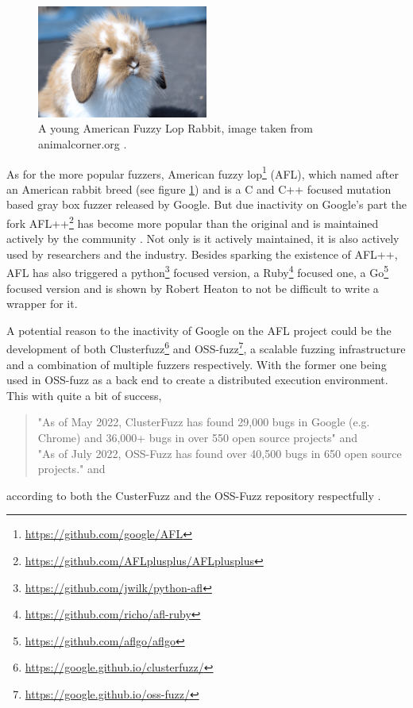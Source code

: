 \begin{figure}
	\centering
	\includegraphics[width=0.5\textwidth]{images/AFLBunny}
	\caption{A young American Fuzzy Lop Rabbit, image taken from animalcorner.org \cite{AFLBunny}.}
	\label{fig:AFLbunny}
\end{figure}

As for the more popular fuzzers, American fuzzy lop\footnote{\url{https://github.com/google/AFL}} (AFL), which named after an American rabbit breed (see figure \ref{fig:AFLbunny}) and is a C and C++ focused mutation based gray box fuzzer released by Google. But due inactivity on Google's part the fork AFL++\footnote{\url{https://github.com/AFLplusplus/AFLplusplus}} has become more popular than the original and is maintained actively by the community \cite{27AFL++}. Not only is it actively maintained, it is also actively used by researchers and the industry. Besides sparking the existence of AFL++, AFL has also triggered a python\footnote{\url{https://github.com/jwilk/python-afl}} focused version, a Ruby\footnote{\url{https://github.com/richo/afl-ruby}} focused one, a Go\footnote{\url{https://github.com/aflgo/aflgo}} focused version and is shown by Robert Heaton \cite{AFLWrapper} to not be difficult to write a wrapper for it.

A potential reason to the inactivity of Google on the AFL project could be the development of both Clusterfuzz\footnote{\url{https://google.github.io/clusterfuzz/}} and OSS-fuzz\footnote{\url{https://google.github.io/oss-fuzz/}}, a scalable fuzzing infrastructure and a combination of multiple fuzzers respectively. With the former one being used in OSS-fuzz as a back end to create a distributed execution environment. This with quite a bit of success,
\begin{quote} 
	"As of May 2022, ClusterFuzz has found 29,000 bugs in Google (e.g. Chrome) and 36,000+ bugs in over 550 open source projects" and \\
	
	"As of July 2022, OSS-Fuzz has found over 40,500 bugs in 650 open source projects." and \\ 
	
\end{quote} according to both the CusterFuzz and the OSS-Fuzz repository respectfully \cite{31OSS-FuzzBugs}. 

